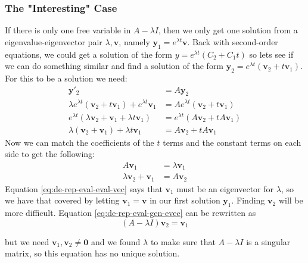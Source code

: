 \documentclass[letterpaper, 11pt, openany]{book}
\theoremstyle{mytheoremstyle}
\theoremstyle{myexamplestyle}
\begin{document}
\subsubsection{The "Interesting" Case}
If there is only one free variable in \(A - \lambda I\), then we only get one solution from a eigenvalue-eigenvector pair \(\lambda, \mathbf{v}\), namely \(\mathbf{y}_{1} = e^{\lambda t} \mathbf{v}\). Back with second-order equations, we could get a solution of the form \(y = e^{\lambda t}\left(C_{2} + C_{1}t\right)\) so lets see if we can do something similar and find a solution of the form \(\mathbf{y}_{2} = e^{\lambda t}\left(\mathbf{v}_{2} + t\mathbf{v}_{1}\right)\). For this to be a solution we need:
\begin{align*}
    \mathbf{y}'_{2} &= A \mathbf{y}_{2}\\
\lambda e^{\lambda t}\left(\mathbf{v}_{2} + t\mathbf{v}_{1}\right) + e^{\lambda t} \mathbf{v}_{1} &= A e^{\lambda t}\left(\mathbf{v}_{2} + t\mathbf{v}_{1}\right)\\
e^{\lambda t} \left(\lambda \mathbf{v}_{2} + \mathbf{v}_{1} + \lambda t \mathbf{v}_{1}\right) &= e^{\lambda t} \left(A \mathbf{v}_{2} + tA\mathbf{v}_{1}\right)\\
\lambda (\mathbf{v}_{2} + \mathbf{v}_{1}) + \lambda t \mathbf{v}_{1} &= A \mathbf{v}_{2} + tA\mathbf{v}_{1}
\end{align*}
Now we can match the coefficients of the \(t\) terms and the constant terms on each side to get the following:
\begin{align}
    A \mathbf{v}_{1} &= \lambda \mathbf{v}_{1}\label{eq:de-rep-eval-eval-vec}\\
    \lambda \mathbf{v}_{2} + \mathbf{v}_{1} &= A \mathbf{v}_{2}\label{eq:de-rep-eval-gen-evec}
\end{align}
Equation \ref{eq:de-rep-eval-eval-vec} says that \(\mathbf{v}_{1}\) must be an eigenvector for \(\lambda\), so we have that covered by letting \(\mathbf{v}_{1} = \mathbf{v}\) in our first solution \(\mathbf{y}_{1}\). Finding \(\mathbf{v}_{2}\) will be more difficult. Equation \ref{eq:de-rep-eval-gen-evec} can be rewritten as 
\begin{equation}\label{eq:de-rep-eval-gen-evec-2}
    (A - \lambda I) \mathbf{v}_{2} = \mathbf{v}_{1}
\end{equation}

but we need \(\mathbf{v}_{1}, \mathbf{v}_{2} \neq \mathbf{0}\) and we found \(\lambda\) to make sure that \(A - \lambda I\) is a singular matrix, so this equation has no unique solution.
\end{document}
